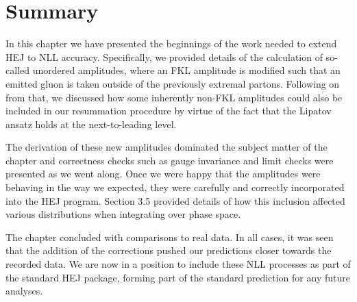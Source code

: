 


\section{Summary}
In this chapter we have presented the beginnings of the work needed to extend HEJ to NLL accuracy. Specifically, we provided details of the calculation of so-called unordered amplitudes, where an FKL amplitude is modified such that an emitted gluon is taken outside of the previously extremal partons. Following on from that, we discussed how some inherently non-FKL amplitudes could also be included in our resummation procedure by virtue of the fact that the Lipatov ansatz holds at the next-to-leading level.

The derivation of these new amplitudes dominated the subject matter of the chapter and correctness checks such as gauge invariance and limit checks were presented as we went along. Once we were happy that the amplitudes were behaving in the way we expected, they were carefully and correctly incorporated into the HEJ program. Section 3.5 provided details of how this inclusion affected various distributions when integrating over phase space. 

The chapter concluded with comparisons to real data. In all cases, it was seen that the addition of the corrections pushed our predictions closer towards the recorded data. We are now in a position to include these NLL processes as part of the standard HEJ package, forming part of the standard prediction for any future analyses. 
